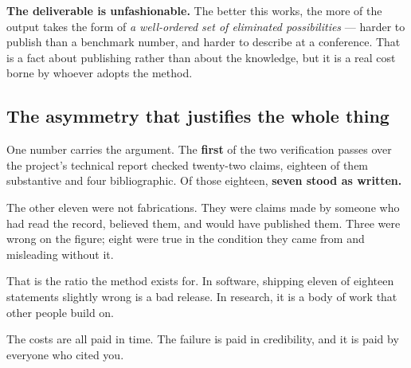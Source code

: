\textbf{The deliverable is unfashionable.} The better this works, the more of the output takes the form of \textit{a well-ordered set of eliminated possibilities} --- harder to publish than a benchmark number, and harder to describe at a conference. That is a fact about publishing rather than about the knowledge, but it is a real cost borne by whoever adopts the method.

\subsection{The asymmetry that justifies the whole thing}

One number carries the argument. The \textbf{first} of the two verification passes over the project's technical report checked twenty-two claims, eighteen of them substantive and four bibliographic. Of those eighteen, \textbf{seven stood as written.}

The other eleven were not fabrications. They were claims made by someone who had read the record, believed them, and would have published them. Three were wrong on the figure; eight were true in the condition they came from and misleading without it.

That is the ratio the method exists for. In software, shipping eleven of eighteen statements slightly wrong is a bad release. In research, it is a body of work that other people build on.

The costs are all paid in time. The failure is paid in credibility, and it is paid by everyone who cited you.
